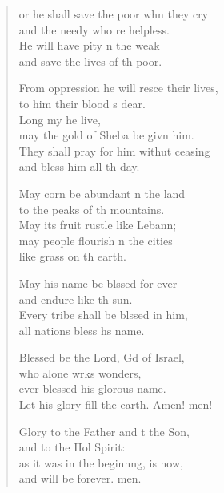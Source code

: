 \begin{verse}
  \begin{patverse}
or he shall save the poor whn they cry\Med\\
and the needy who re helpless.\\
He will have pity n the weak\Med\\
and save the lives of th poor.

From oppression he will resce their lives,\Med\\
to him their blood \pointup{\i}s dear.\\
Long my he live,\Med\\
may the gold of Sheba be givn him.\\
They shall pray for him withut ceasing\Med\\
and bless him all th day.

May corn be abundant \pointup{\i}n the land\Med\\
to the peaks of th mountains.\\
May its fruit rustle like Lebann;\Flex\\
may people flourish \pointup{\i}n the cities\Med\\
like grass on th earth.

May his name be blssed for ever\Med\\
and endure like th sun.\\
Every tribe shall be blssed in him,\Med\\
all nations bless h\pointup{\i}s name.

Blessed be the Lord, Gd of Israel,\Med\\
who alone wrks wonders,\\
ever blessed his glor\pointup{\i}ous name.\Med\\
Let his glory fill the earth. Amen! men!

Glory to the Father and t the Son,\Med\\
and to the Hol Spirit:\\
as it was in the beginn\pointup{\i}ng, is now,\Med\\
and will be forever. men.
  \end{patverse}
\end{verse}
